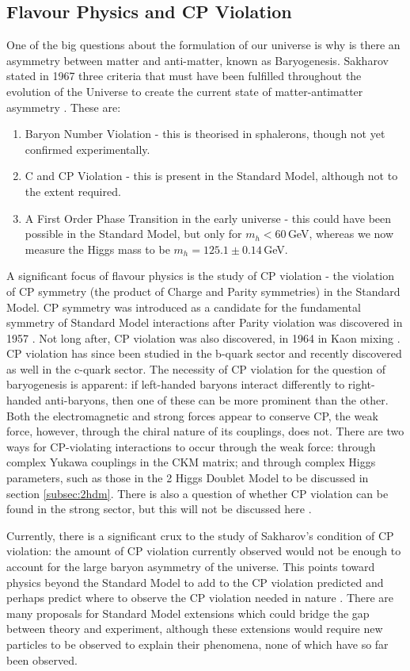 \documentclass[a4paper,12pt]{article}
\begin{document}
\subsection{Flavour Physics and CP Violation}
\label{subsec:flavobs}
One of the big questions about the formulation of our universe is why is there an asymmetry between matter and anti-matter, known as Baryogenesis. 
Sakharov stated in 1967 three criteria that must have been fulfilled throughout the evolution of the Universe to create the current state of matter-antimatter asymmetry \cite{sak}. 
These are:
\begin{enumerate}
    \item Baryon Number Violation - this is theorised in sphalerons, though not yet confirmed experimentally. 
    \item C and CP Violation - this is present in the Standard Model, although not to the extent required. 
    \item A First Order Phase Transition in the early universe - this could have been possible in the Standard Model, but only for $m_h<60\,$GeV, whereas we now measure the Higgs mass to be $m_h=125.1\pm0.14\,$GeV.
\end{enumerate}
A significant focus of flavour physics is the study of CP violation - the violation of CP symmetry (the product of Charge and Parity symmetries) in the Standard Model.
CP symmetry was introduced as a candidate for the fundamental symmetry of Standard Model interactions after Parity violation was discovered in 1957 \cite{wu}.
Not long after, CP violation was also discovered, in 1964 in Kaon mixing \cite{cpv}.
CP violation has since been studied in the b-quark sector and recently discovered as well in the c-quark sector. 
The necessity of CP violation for the question of baryogenesis is apparent: if left-handed baryons interact differently to right-handed anti-baryons, then one of these can be more prominent than the other. 
Both the electromagnetic and strong forces appear to conserve CP, the weak force, however, through the chiral nature of its couplings, does not.
There are two ways for CP-violating interactions to occur through the weak force: through complex Yukawa couplings in the CKM matrix; and through complex Higgs parameters, such as those in the 2 Higgs Doublet Model to be discussed in section \ref{subsec:2hdm}.
There is also a question of whether CP violation can be found in the strong sector, but this will not be discussed here \cite{kane}.

Currently, there is a significant crux to the study of Sakharov's condition of CP violation: the amount of CP violation currently observed would not be enough to account for the large baryon asymmetry of the universe. 
This points toward physics beyond the Standard Model to add to the CP violation predicted and perhaps predict where to observe the CP violation needed in nature \cite{dono}. 
There are many proposals for Standard Model extensions which could bridge the gap between theory and experiment, although these extensions would require new particles to be observed to explain their phenomena, none of which have so far been observed. 
\end{document}
